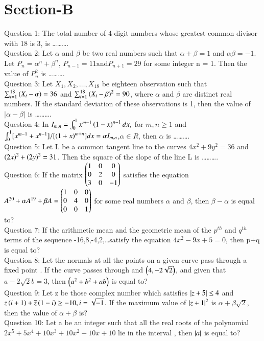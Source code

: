 \documentclass[journal]{IEEEtran}
\begin{document}
\section{Section-B}
Question 1: The total number of 4-digit numbers whose greatest common divisor with 18 is 3, is \ldots\ldots\ldots.\vspace{50mm}\\
Question 2: Let $\alpha$ and $\beta$ be two real numbers such that $\alpha + \beta = 1$ and $\alpha\beta = -1$. Let $P_n = \alpha^n + \beta^n$, $P_{n-1} = 11 \text{and} P_{n+1} = 29$ for some integer n = 1. Then the value of $P_n ^2$ is \ldots\ldots\ldots.\vspace{0.5mm}\\
Question 3: Let $X_1,X_2,\ldots,X_{18}$ be eighteen observation such that $\sum_{i=1} ^{18} \left(X_i - \alpha\right) = 36$ and $\sum_{i=1} ^{18} \left(X_i - \beta\right)^2 = 90$, where $\alpha$ and $\beta$ are distinct real numbers. If the standard deviation of these observations is 1, then the value of $|\alpha - \beta|$ is \ldots\ldots\ldots.\vspace{0.5mm} \\ 
Question 4: In $I_{m,n} = \int _0 ^1 x^{m-1}\left(1-x\right)^{n-1}dx,$ for $m,n\geq1$ and $\int _0 ^1[x^{m-1} + x^{n-1}]/[\left(1+x\right)^{m+n}]dx = \alpha I_{m,n}$,$\alpha \in R$, then $\alpha$ is \ldots\ldots\ldots. \vspace{0.5mm}\\
Question 5: Let L be a common tangent line to the curves $4x^2 + 9y^2 = 36$ and $\left(2x\right)^2 + \left(2y\right)^2=31$. Then the square of the slope of the line L is \ldots\ldots\ldots.\vspace{0.5mm}\\
Question 6: If the matrix $\begin{pmatrix}1&0&0\\0&2&0\\3&0&-1\end{pmatrix}$
satisfies the equation $A^{20} + \alpha A^{19} + \beta A = \begin{pmatrix}1&0&0\\0&4&0\\0&0&1\end{pmatrix}$ for some real numbers $\alpha$ and $\beta$, then $\beta - \alpha$ is equal to?\vspace{0.5mm}\\
Question 7: If the arithmetic mean and the geometric mean of the $p^{th}$ and $q^{th}$ terms of the sequence -16,8,-4,2,\ldots satisfy the equation $4x^2-9x+5=0$, then p+q is equal to?\vspace{0.5mm}\\
Question 8: Let the normals at all the points on a given curve pass through a fixed point . If the curve passes through  and $\left(4,-2\sqrt{2}\right)$, and given that $a-2\sqrt{2}b = 3$, then $\left(a^2+b^2+ab\right)$ is equal to?\vspace{0.5mm}\\
Question 9: Let z be those complex number which satisfies $\left\vert z+5\right\vert\leq 4$ and $z\left(i+1\right)+\overline{z}\left(1-i\right)\geq-10, i = \sqrt{-1}$. If the maximum value of $\left\vert z+1\right\vert^2$ is $\alpha + \beta \sqrt{2}$, then the value of $\alpha+\beta$ is?\vspace{0.5mm}\\
Question 10: Let a be an integer such that all the real roots of the polynomial $2x^5+5x^4+10x^3+10x^2+10x+10$ lie in the interval , then $\left\vert a\right\vert$ is equal to?
\end{document}
